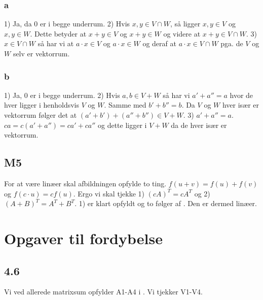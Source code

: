 			\subsubsection{a}

				1) Ja, da $0$ er i begge underrum. 2) Hvis $x,y\in V \cap W$, så ligger $x,y\in V$ og $x,y\in W$. Dette betyder at $x+y\in V$ og $x+y\in W$ og videre at $x+y\in V\cap W$. 3) $x\in V \cap W$ så har vi at $a\cdot x\in V$ og $a\cdot x\in W$ og deraf at $a\cdot x\in V \cap W$ pga. de $V$ og $W$ selv er vektorrum.

			\subsubsection{b}

				1) Ja, $0$ er i begge underrum. 2) Hvis $a,b\in V + W$ så har vi $a'+a''=a$ hvor de hver ligger i henholdsvis $V$ og $W$. Samme med $b'+b''=b$. Da $V$ og $W$ hver især er vektorrum følger det at $(a'+b')+(a''+b'')\in V+W$. 3) $a'+a''=a$. $ca=c(a'+a'')=ca'+ca''$ og dette ligger i $V+W$ da de hver især er vektorrum.

		\subsection{M5}

			For at være linæer skal afbildningen opfylde to ting. $f(u+v)=f(u)+f(v)$ og $f(c\cdot u)=cf(u)$. Ergo vi skal tjekke 1) $(cA)^T=cA^T$ og 2) $(A+B)^T=A^T+B^T$. 1) er klart opfyldt og to følger af \cite[Sætning 2.6.7]{hesselholt2017}. Den er dermed linæer.

	\section{Opgaver til fordybelse}

		\subsection{4.6}

			Vi ved allerede matrixsum opfylder A1-A4 i \cite[Definition 4.1.1]{hesselholt2017}. Vi tjekker V1-V4.
